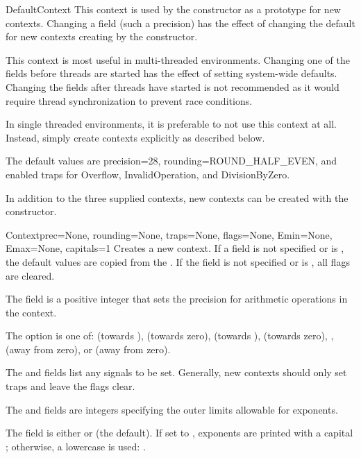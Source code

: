 \begin{classdesc*}{DefaultContext}
  This context is used by the  constructor as a prototype for
  new contexts.  Changing a field (such a precision) has the effect of
  changing the default for new contexts creating by the 
  constructor.

  This context is most useful in multi-threaded environments.  Changing one of
  the fields before threads are started has the effect of setting system-wide
  defaults.  Changing the fields after threads have started is not recommended
  as it would require thread synchronization to prevent race conditions.

  In single threaded environments, it is preferable to not use this context
  at all.  Instead, simply create contexts explicitly as described below.

  The default values are precision=28, rounding=ROUND_HALF_EVEN, and enabled
  traps for Overflow, InvalidOperation, and DivisionByZero.
\end{classdesc*}


In addition to the three supplied contexts, new contexts can be created
with the  constructor.

\begin{classdesc}{Context}{prec=None, rounding=None, traps=None,
        flags=None, Emin=None, Emax=None, capitals=1}
  Creates a new context.  If a field is not specified or is ,
  the default values are copied from the .  If the
   field is not specified or is , all flags are
  cleared.

  The  field is a positive integer that sets the precision for
  arithmetic operations in the context.

  The  option is one of:
       (towards ),
       (towards zero),
       (towards ),
       (towards zero),
      ,
       (away from zero), or
       (away from zero).

  The  and  fields list any signals to be set.
  Generally, new contexts should only set traps and leave the flags clear.

  The  and  fields are integers specifying the outer
  limits allowable for exponents.

  The  field is either  or  (the
  default). If set to , exponents are printed with a capital
  ; otherwise, a lowercase  is used:
  .
\end{classdesc}

